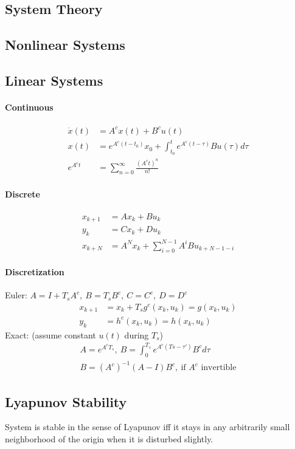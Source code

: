 \documentclass[landscape,a4paper,8pt]{scrartcl}
\begin{document}
\raggedright

\begin{multicols*}{3}
\section{System Theory}
\subsection{Nonlinear Systems}
\subsection{Linear Systems}
\paragraph{Continuous}
\begin{align*}
\dot{x}(t) &= A^cx(t)+B^cu(t)\\
x(t) &= e^{A^c(t-t_0)}x_0+\int_{t_0}^te^{A^c(t-\tau)}Bu(\tau)d\tau \\
e^{A^ct}&=\sum_{n=0}^\infty\frac{(A^ct)^n}{n!}
\end{align*}
\paragraph{Discrete}
\begin{align*}
x_{k+1} &= Ax_k+Bu_k\\
y_k &= Cx_k + Du_k\\
x_{k+N}&=A^Nx_k+\sum_{i=0}^{N-1}A^iBu_{k+N-1-i}
\end{align*}

\paragraph{Discretization}
Euler: $A = I + T_s A^c ,\ B = T_s B^c ,\ C = C^c ,\ D = D^c $
\begin{align*}
x_{k + 1} &= x_k + T_s g^c(x_k,u_k) = g(x_k,u_k) \\
y_{k}     &= h^c(x_k, u_k) = h(x_k, u_k)
\end{align*}
Exact: (assume constant $u(t)$ during $T_s$)
\begin{align*}
A = e^{A^cT_s},\ B = \int_0^{T_s} e^{A^c(Ts-\tau')}B^cd\tau \\
B=(A^c)^{-1}(A-I)B^c,\ \text{if $A^c$ invertible}
\end{align*}

\subsection{Lyapunov Stability}
System is stable in the sense of Lyapunov iff it stays in any arbitrarily small neighborhood of the origin when it is disturbed slightly.

\end{multicols*}
\end{document}
